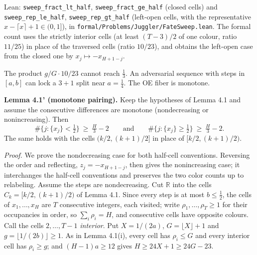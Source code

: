 \documentclass[11pt,a4paper]{article}
\begin{document}
Lean: \texttt{\nolinkurl{sweep_fract_lt_half}},
\texttt{\nolinkurl{sweep_fract_ge_half}} (closed cells) and
\texttt{\nolinkurl{sweep_rep_le_half}},
\texttt{\nolinkurl{sweep_rep_gt_half}} (left-open cells, with the
representative \(x-\lceil x\rceil+1\in(0,1]\)), in
\texttt{\nolinkurl{formal/Problems/Juggler/FateSweep.lean}}. The formal
count uses the strictly interior cells (at least \((T-3)/2\) of one
colour, ratio \(11/25\)) in place of the traversed cells (ratio
\(10/23\)), and obtains the left-open case from the closed one by
\(x_j\mapsto -x_{H+1-j}\).

The product \(g/G\cdot 10/23\) cannot reach \(\tfrac13\). An adversarial
sequence with steps in \([a,b]\) can lock a \(3+1\) split near
\(a=\tfrac14\). The OE fiber is monotone.

\textbf{Lemma 4.1' (monotone pairing).} Keep the hypotheses of Lemma 4.1
and assume the consecutive differences are monotone (nondecreasing or
nonincreasing). Then \[
\#\{j:\{x_j\}<\tfrac12\}\ \ge\ \tfrac H3-2
\qquad\text{and}\qquad
\#\{j:\{x_j\}\ge\tfrac12\}\ \ge\ \tfrac H3-2.
\] The same holds with the cells \((k/2,(k+1)/2]\) in place of
\([k/2,(k+1)/2)\).

\emph{Proof.} We prove the nondecreasing case for both half-cell
conventions. Reversing the order and reflecting, \(z_j=-x_{H+1-j}\),
then gives the nonincreasing case; it interchanges the half-cell
conventions and preserves the two color counts up to relabeling. Assume
the steps are nondecreasing. Cut \(\mathbb R\) into the cells
\(C_k=[k/2,(k+1)/2)\) of Lemma 4.1. Since every step is at most
\(b\le\tfrac12\), the cells of \(x_1,\dots,x_H\) are \(T\) consecutive
integers, each visited; write \(\rho_1,\dots,\rho_T\ge 1\) for their
occupancies in order, so \(\sum_i\rho_i=H\), and consecutive cells have
opposite colours. Call the cells \(2,\dots,T-1\) \emph{interior}. Put
\(X=1/(2a)\), \(G=\lfloor X\rfloor+1\) and
\(g=\lfloor 1/(2b)\rfloor\ge 1\). As in Lemma 4.1(i), every cell has
\(\rho_i\le G\) and every interior cell has \(\rho_i\ge g\); and
\((H-1)a\ge 12\) gives \(H\ge 24X+1\ge 24G-23\).
\end{document}

